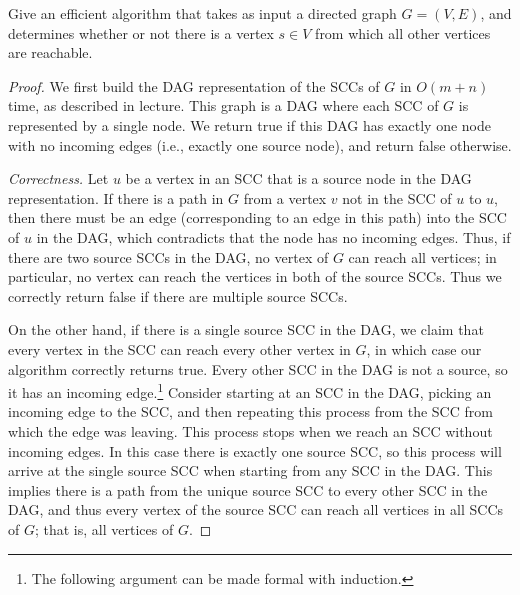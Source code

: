 \documentclass{article}
\begin{document}
    \begin{exercise}[DPV 3.22] 
      Give an efficient algorithm that takes as input a directed graph $G = (V,E)$, and determines whether or not there is a vertex $s \in V$ from which all other vertices are reachable.
    \end{exercise}
    \begin{proof}
      We first build the DAG representation of the SCCs of $G$ in $O(m+n)$ time, as described in lecture. This graph is a DAG where each SCC of $G$ is represented by a single node. We return true if this DAG has exactly one node with no incoming edges (i.e., exactly one source node), and return false otherwise.

      \textit{Correctness.} Let $u$ be a vertex in an SCC that is a source node in the DAG representation. If there is a path in $G$ from a vertex $v$ not in the SCC of $u$ to $u$, then there must be an edge (corresponding to an edge in this path) into the SCC of $u$ in the DAG, which contradicts that the node has no incoming edges. Thus, if there are two source SCCs in the DAG, no vertex of $G$ can reach all vertices; in particular, no vertex can reach the vertices in both of the source SCCs. Thus we correctly return false if there are multiple source SCCs. 
      
      On the other hand, if there is a single source SCC in the DAG, we claim that every vertex in the SCC can reach every other vertex in $G$, in which case our algorithm correctly returns true. Every other SCC in the DAG is not a source, so it has an incoming edge.\footnote{The following argument can be made formal with induction.} Consider starting at an SCC in the DAG, picking an incoming edge to the SCC, and then repeating this process from the SCC from which the edge was leaving. This process stops when we reach an SCC without incoming edges. In this case there is exactly one source SCC, so this process will arrive at the single source SCC when starting from any SCC in the DAG. This implies there is a path from the unique source SCC to every other SCC in the DAG, and thus every vertex of the source SCC can reach all vertices in all SCCs of $G$; that is, all vertices of $G$.
    \end{proof}
\end{document}
